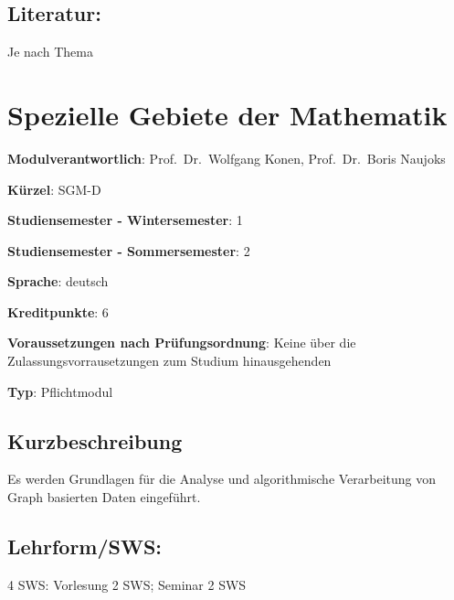 \section*{Literatur:}\label{literatur-1}

Je nach Thema

\chapter{Spezielle Gebiete der
Mathematik}\label{spezielle-gebiete-der-mathematik}

\begin{modulHead}
\textbf{Modulverantwortlich}: Prof.~Dr.~Wolfgang
Konen, Prof.~Dr.~Boris
Naujoks
\end{modulHead}
\begin{modulHead}
\textbf{Kürzel}:
SGM-D
\end{modulHead}
\begin{modulHead}
\textbf{Studiensemester -
Wintersemester}:
1
\end{modulHead}
\begin{modulHead}
\textbf{Studiensemester -
Sommersemester}: 2
\end{modulHead}
\begin{modulHead}
\textbf{Sprache}:
deutsch
\end{modulHead}
\begin{modulHead}
\textbf{Kreditpunkte}:
6
\end{modulHead}
\begin{modulHead}
\textbf{Voraussetzungen nach
Prüfungsordnung}: Keine über die Zulassungsvorrausetzungen zum Studium
hinausgehenden
\end{modulHead}
\begin{modulHead}
\textbf{Typ}:
Pflichtmodul
\end{modulHead}


\section*{Kurzbeschreibung}\label{kurzbeschreibung-1}

Es werden Grundlagen für die Analyse und algorithmische Verarbeitung von
Graph basierten Daten eingeführt.

\section*{Lehrform/SWS:}\label{lehrformsws-2}

4 SWS: Vorlesung 2 SWS; Seminar 2 SWS


